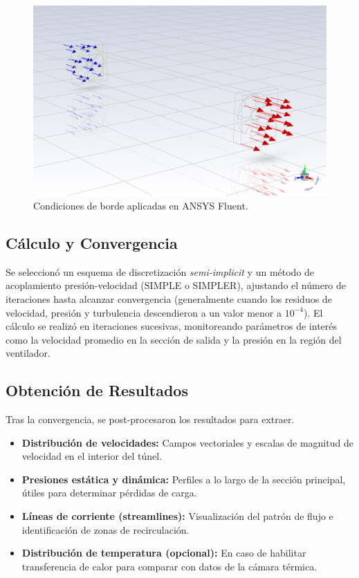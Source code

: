 \begin{figure}[!ht]
    \centering
    \includegraphics[width=0.7\linewidth]{images/borde.png}
    \caption{Condiciones de borde aplicadas en ANSYS Fluent.}
    \label{fig:borde}
\end{figure}

\subsection{Cálculo y Convergencia}
Se seleccionó un esquema de discretización \textit{semi-implicit} y un método de acoplamiento presión-velocidad (SIMPLE o SIMPLER), ajustando el número de iteraciones hasta alcanzar convergencia (generalmente cuando los residuos de velocidad, presión y turbulencia descendieron a un valor menor a $10^{-4}$). El cálculo se realizó en iteraciones sucesivas, monitoreando parámetros de interés como la velocidad promedio en la sección de salida y la presión en la región del ventilador.



\subsection{Obtención de Resultados}
Tras la convergencia, se post-procesaron los resultados para extraer.
\begin{itemize}
    \item \textbf{Distribución de velocidades:} Campos vectoriales y escalas de magnitud de velocidad en el interior del túnel.
    \item \textbf{Presiones estática y dinámica:} Perfiles a lo largo de la sección principal, útiles para determinar pérdidas de carga.
    \item \textbf{Líneas de corriente (streamlines):} Visualización del patrón de flujo e identificación de zonas de recirculación.
    \item \textbf{Distribución de temperatura (opcional):} En caso de habilitar transferencia de calor para comparar con datos de la cámara térmica.
\end{itemize}


